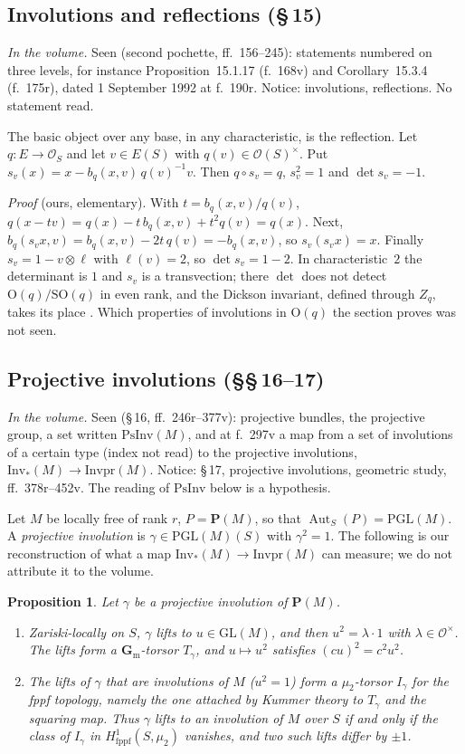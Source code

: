 \documentclass[11pt,a4paper]{amsart}
\newcommand{\cO}{\mathcal{O}}
\newcommand{\GL}{\mathrm{GL}}
\newcommand{\PGL}{\mathrm{PGL}}
\newcommand{\Ort}{\mathrm{O}}
\newcommand{\SO}{\mathrm{SO}}
\newcommand{\Gm}{\mathbf{G}_{\mathrm m}}
\newcommand{\Pj}{\mathbf{P}}
\newcommand{\status}[1]{\par\smallskip\noindent\textit{In the volume.} #1\par\smallskip}
\theoremstyle{plain}
\newtheorem{proposition}[theorem]{Proposition}
\theoremstyle{definition}
\begin{document}
\subsection{Involutions and reflections (\S\,15)}\label{sub:refl}
\status{Seen (second pochette, ff.~156--245): statements numbered on three levels, for instance Proposition~15.1.17 (f.~168v) and Corollary~15.3.4 (f.~175r), dated 1 September 1992 at f.~190r. Notice: involutions, reflections. No statement read.}
The basic object over any base, in any characteristic, is the reflection. Let $q\colon E\to\cO_S$ and let $v\in E(S)$ with $q(v)\in\cO(S)^\times$. Put $s_v(x)=x-b_q(x,v)\,q(v)^{-1}v$. Then $q\circ s_v=q$, $s_v^2=1$ and $\det s_v=-1$.

\noindent\emph{Proof} (ours, elementary). With $t=b_q(x,v)/q(v)$, $q(x-tv)=q(x)-t\,b_q(x,v)+t^2q(v)=q(x)$. Next, $b_q(s_vx,v)=b_q(x,v)-2t\,q(v)=-b_q(x,v)$, so $s_v(s_vx)=x$. Finally $s_v=1-v\otimes\ell$ with $\ell(v)=2$, so $\det s_v=1-2$. In characteristic~$2$ the determinant is $1$ and $s_v$ is a transvection; there $\det$ does not detect $\Ort(q)/\SO(q)$ in even rank, and the Dickson invariant, defined through $Z_q$, takes its place \cite[(C.2.2)]{conrad}. Which properties of involutions in $\Ort(q)$ the section proves was not seen.

\subsection{Projective involutions (\S\S\,16--17)}\label{sub:projinv}
\status{Seen (\S\,16, ff.~246r--377v): projective bundles, the projective group, a set written $\mathrm{PsInv}(M)$, and at f.~297v a map from a set of involutions of a certain type (index not read) to the projective involutions, $\mathrm{Inv}_*(M)\to\mathrm{Invpr}(M)$. Notice: \S\,17, projective involutions, geometric study, ff.~378r--452v. The reading of $\mathrm{PsInv}$ below is a hypothesis.}
Let $M$ be locally free of rank $r$, $P=\Pj(M)$, so that $\operatorname{Aut}_S(P)=\PGL(M)$. A \emph{projective involution} is $\gamma\in\PGL(M)(S)$ with $\gamma^2=1$. The following is our reconstruction of what a map $\mathrm{Inv}_*(M)\to\mathrm{Invpr}(M)$ can measure; we do not attribute it to the volume.

\begin{proposition}\label{prop:lift}
Let $\gamma$ be a projective involution of $\Pj(M)$.
\begin{enumerate}
\item Zariski-locally on $S$, $\gamma$ lifts to $u\in\GL(M)$, and then $u^2=\lambda\cdot1$ with $\lambda\in\cO^\times$. The lifts form a $\Gm$-torsor $T_\gamma$, and $u\mapsto u^2$ satisfies $(cu)^2=c^2u^2$.
\item The lifts of $\gamma$ that are involutions of $M$ ($u^2=1$) form a $\mu_2$-torsor $I_\gamma$ for the fppf topology, namely the one attached by Kummer theory to $T_\gamma$ and the squaring map. Thus $\gamma$ lifts to an involution of $M$ over $S$ if and only if the class of $I_\gamma$ in $H^1_{\mathrm{fppf}}(S,\mu_2)$ vanishes, and two such lifts differ by $\pm1$.
\end{enumerate}
\end{proposition}
\end{document}
